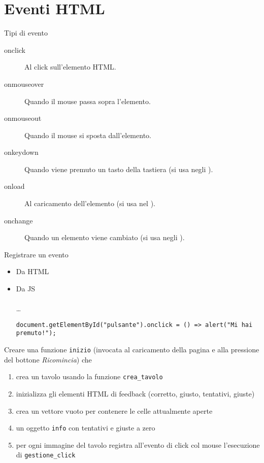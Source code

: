 \section[Eventi]{Eventi HTML}
\begin{frame}{Tipi di evento}\transfade\centering
  \begin{description}
    \item[onclick] Al click sull'elemento HTML.
    \item[onmouseover] Quando il mouse passa sopra l'elemento.
    \item[onmouseout] Quando il mouse si sposta dall'elemento.
    \item[onkeydown] Quando viene premuto un tasto della tastiera (si usa negli ).
    \item[onload] Al caricamento dell'elemento (si usa nel ).
    \item[onchange] Quando un elemento viene cambiato (si usa negli ).
  \end{description}
\end{frame}

\begin{frame}[fragile]{Registrare un evento}\transfade\centering
  \begin{itemize}[<+->]
    \item Da HTML\\
    \item Da JS\\
      \\\dots\\
      \begin{verbatim}
document.getElementById("pulsante").onclick = () => alert("Mi hai premuto!");
      \end{verbatim}
  \end{itemize}
\end{frame}




\begin{frame}\transfade
  \begin{exercise}\centering
    Creare una funzione \texttt{inizio} (invocata al caricamento della pagina e alla pressione del bottone \emph{Ricomincia}) che
    \begin{enumerate}
      \item crea un tavolo usando la funzione \texttt{crea\_tavolo}
      \item inizializza gli elementi HTML di feedback (corretto, giusto, tentativi, giuste)
      \item crea un vettore vuoto per contenere le celle attualmente aperte
      \item un oggetto \texttt{info} con tentativi e giuste a zero
      \item per ogni immagine del tavolo registra all'evento di click col mouse l'esecuzione di \texttt{gestione\_click}
    \end{enumerate}
  \end{exercise}
\end{frame}

